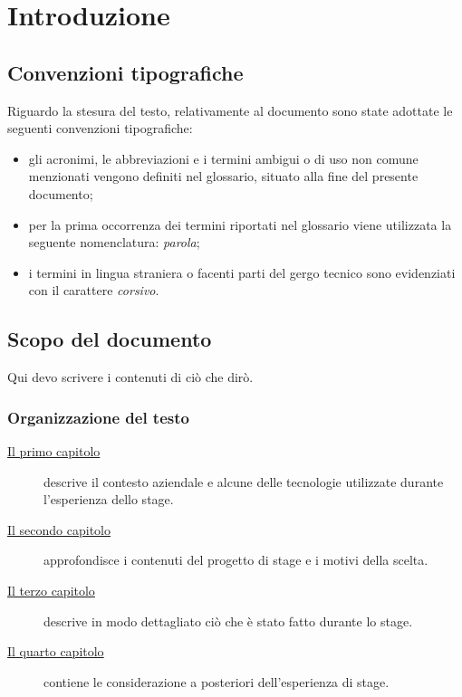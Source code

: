 
\chapter{Introduzione}
\label{cap:introduzione}
\section{Convenzioni tipografiche}

Riguardo la stesura del testo, relativamente al documento sono state adottate le seguenti convenzioni tipografiche:
\begin{itemize}
	\item gli acronimi, le abbreviazioni e i termini ambigui o di uso non comune menzionati vengono definiti nel glossario, situato alla fine del presente documento;
	\item per la prima occorrenza dei termini riportati nel glossario viene utilizzata la seguente nomenclatura: \emph{parola}\glsfirstoccur;
	\item i termini in lingua straniera o facenti parti del gergo tecnico sono evidenziati con il carattere \emph{corsivo}.
\end{itemize}

\section{Scopo del documento}
Qui devo scrivere i contenuti di ciò che dirò.


\subsection{Organizzazione del testo}

\begin{description}

    \item[{\hyperref[cap:introduzione]{Il primo capitolo}}] descrive il contesto aziendale e alcune delle tecnologie utilizzate durante l'esperienza dello stage.

    \item[{\hyperref[cap:descrizione-stage]{Il secondo capitolo}}] approfondisce i contenuti del progetto di stage e i motivi della scelta.

    \item[{\hyperref[cap:ilprogetto]{Il terzo capitolo}}] descrive in modo dettagliato ciò che è stato fatto durante lo stage.

    \item[{\hyperref[cap:valutazione-retrospettiva]{Il quarto capitolo}}] contiene le considerazione a posteriori dell'esperienza di stage.

\end{description}

